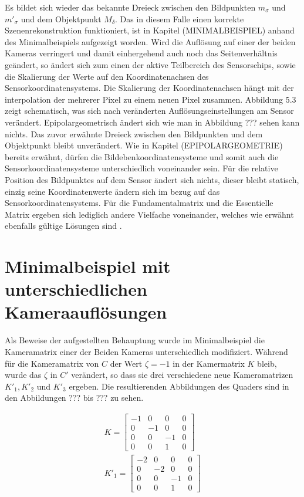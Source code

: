 Es bildet sich wieder das bekannte Dreieck zwischen den Bildpunkten $m_\sigma$ und $m'_{\sigma}$ und dem Objektpunkt $M_\delta$. Das in diesem Falle einen korrekte Szenenrekonstruktion funktioniert, ist in Kapitel (MINIMALBEISPIEL) anhand des Minimalbeispiels aufgezeigt worden. Wird die Auflösung auf einer der beiden Kameras verringert und damit einhergehend auch noch das Seitenverhältnis geändert, so ändert sich zum einen der aktive Teilbereich des Sensorschips, sowie die Skalierung der Werte auf den Koordinatenachsen des Sensorkoordinatensystems. Die Skalierung der Koordinatenachsen hängt mit der interpolation der mehrerer Pixel zu einem neuen Pixel zusammen. Abbildung 5.3 zeigt schematisch, was sich nach veränderten Auflösungseinstellungen am Sensor verändert.%
Epipolargeometrisch ändert sich wie man in Abbildung ??? sehen kann nichts. Das zuvor erwähnte Dreieck zwischen den Bildpunkten und dem Objektpunkt bleibt unverändert. Wie in Kapitel (EPIPOLARGEOMETRIE) bereits erwähnt, dürfen die Bildebenkoordinatensysteme und somit auch die Sensorkoordinatensysteme unterschiedlich voneinander sein\cite{Elements}. Für die relative Position des Bildpunktes auf dem Sensor ändert sich nichts, dieser bleibt statisch, einzig seine Koordinatenwerte ändern sich im bezug auf das Sensorkoordinatensystems. Für die Fundamentalmatrix und die Essentielle Matrix ergeben sich lediglich andere Vielfache voneinander, welches wie erwähnt ebenfalls gültige Lösungen sind \cite{HZ,Ferid}.

\section{Minimalbeispiel mit unterschiedlichen Kameraauflösungen}

Als Beweise der aufgestellten Behauptung wurde im Minimalbeispiel die Kameramatrix einer der Beiden Kameras unterschiedlich modifiziert. Während für die Kameramatrix von $C$ der Wert $\zeta = -1$ in der Kamermatrix $K$ bleib, wurde das $\zeta$ in $C'$ verändert, so dass sie drei verschiedene neue Kameramatrizen $K'_1, K'_2$ und $K'_3$ ergeben. Die resultierenden Abbildungen des Quaders sind in den Abbildungen ??? bis ??? zu sehen.



\begin{gather}
K = \begin{bmatrix}
-1&0&0&0\\
0&-1&0&0\\
0&0&-1&0\\
0&0&1&0
\end{bmatrix}\\
K'_1 = \begin{bmatrix}
-2&0&0&0\\
0&-2&0&0\\
0&0&-1&0\\
0&0&1&0
\end{bmatrix}\\
\end{gather}

